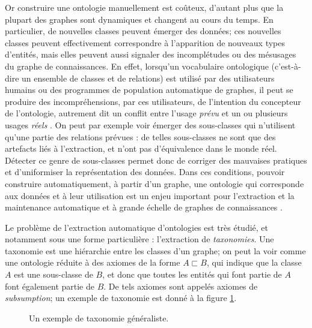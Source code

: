 Or construire une ontologie manuellement est coûteux, d'autant plus que la plupart des graphes sont dynamiques et changent au cours du temps. %
%
En particulier, de nouvelles classes peuvent émerger des données; ces nouvelles classes peuvent effectivement correspondre à l'apparition de nouveaux types d'entités, mais elles peuvent aussi signaler des incomplétudes ou des mésusages du graphe de connaissances.
En effet, lorsqu'un vocabulaire ontologique (c'est-à-dire un ensemble de classes et de relations) est utilisé par des utilisateurs humains ou des programmes de population automatique de graphes, il peut se produire des incompréhensions, par ces utilisateurs, de l'intention du concepteur de l'ontologie, autrement dit un conflit entre l'usage \textit{prévu} et un ou plusieurs usages \textit{réels} \cite{adrian2013inconsistency}. On peut par exemple voir émerger des sous-classes qui n'utilisent qu'une partie des relations prévues : de telles sous-classes ne sont que des artefacts liés à l'extraction, et n'ont pas d'équivalence dans le monde réel. Détecter ce genre de sous-classes permet donc de corriger des mauvaises pratiques et d'uniformiser la représentation des données. %
%
Dans ces conditions, pouvoir construire automatiquement, à partir d'un graphe, une ontologie qui corresponde aux données et à leur utilisation est un enjeu important pour l'extraction et la maintenance automatique et à grande échelle de graphes de connaissances \cite{zhou2007ontology}.

Le problème de l'extraction automatique d'ontologies est très étudié, et notamment sous une forme particulière : l'extraction de \textit{taxonomies}. Une taxonomie est une hiérarchie entre les classes d'un graphe; on peut la voir comme une ontologie réduite à des axiomes de la forme $A \sqsubset B$, qui indique que la classe $A$ est une sous-classe de $B$, et donc que toutes les entités qui font partie de $A$ font également partie de $B$. De tels axiomes sont appelés axiomes de \textit{subsumption}; un exemple de taxonomie est donné à la figure \ref{fig:intro-taxo}.

\begin{figure}[h]
    \centering
    
    \caption{Un exemple de taxonomie généraliste.}
    \label{fig:intro-taxo}
\end{figure}


